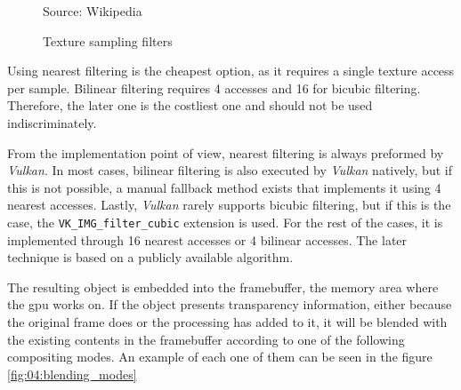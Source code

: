 \documentclass[../main.tex]{subfiles}
\begin{document}
\begin{figure}[htbp]
    \centering
    
    Source: Wikipedia
    \caption{Texture sampling filters}
    \label{fig:04:texture_sampling2}
\end{figure}

Using nearest filtering is the cheapest option, as it requires a single texture access per sample. Bilinear filtering requires 4 accesses and 16 for bicubic filtering. Therefore, the later one is the costliest one and should not be used indiscriminately.\newline

From the implementation point of view, nearest filtering is always preformed by \textit{Vulkan}. In most cases, bilinear filtering is also executed by \textit{Vulkan} natively, but if this is not possible, a manual fallback method exists that implements it using 4 nearest accesses. Lastly, \textit{Vulkan} rarely supports bicubic filtering, but if this is the case, the \texttt{VK\_IMG\_filter\_cubic} extension is used. For the rest of the cases, it is implemented through 16 nearest accesses or 4 bilinear accesses. The later technique is based on a publicly available algorithm\cite{bicubicGlsl}.\newline

The resulting object is embedded into the framebuffer, the memory area where the \gls{gpu} works on. If the object presents transparency information, either because the original frame does or the processing has added to it, it will be blended with the existing contents in the framebuffer according to one of the following compositing modes. An example of each one of them can be seen in the figure \ref{fig:04:blending_modes}
\end{document}
